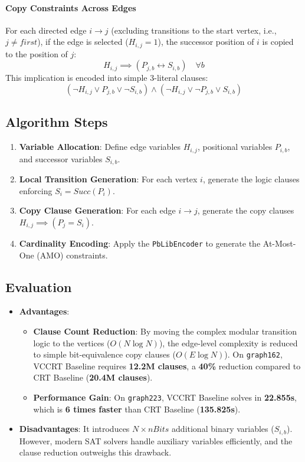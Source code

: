 \paragraph{Copy Constraints Across Edges}
For each directed edge $i \to j$ (excluding transitions to the start vertex, i.e., $j \neq first$), if the edge is selected ($H_{i,j} = 1$), the successor position of $i$ is copied to the position of $j$:
\begin{equation}
    H_{i,j} \implies (P_{j,b} \leftrightarrow S_{i,b}) \quad \forall b
\end{equation}
This implication is encoded into simple 3-literal clauses:
\begin{equation}
    \left( \neg H_{i,j} \lor P_{j,b} \lor \neg S_{i,b} \right) \land \left( \neg H_{i,j} \lor \neg P_{j,b} \lor S_{i,b} \right)
\end{equation}

\subsection{Algorithm Steps}
\begin{enumerate}
    \item \textbf{Variable Allocation}: Define edge variables $H_{i,j}$, positional variables $P_{i,b}$, and successor variables $S_{i,b}$.
    \item \textbf{Local Transition Generation}: For each vertex $i$, generate the logic clauses enforcing $S_i = Succ(P_i)$.
    \item \textbf{Copy Clause Generation}: For each edge $i \to j$, generate the copy clauses $H_{i,j} \implies (P_j = S_i)$.
    \item \textbf{Cardinality Encoding}: Apply the \texttt{PbLibEncoder} to generate the At-Most-One (AMO) constraints.
\end{enumerate}

\subsection{Evaluation}
\begin{itemize}
    \item \textbf{Advantages}:
    \begin{itemize}
        \item \textbf{Clause Count Reduction}: By moving the complex modular transition logic to the vertices ($O(N \log N)$), the edge-level complexity is reduced to simple bit-equivalence copy clauses ($O(E \log N)$). On \texttt{graph162}, VCCRT Baseline requires \textbf{12.2M clauses}, a \textbf{40\%} reduction compared to CRT Baseline (\textbf{20.4M clauses}).
        \item \textbf{Performance Gain}: On \texttt{graph223}, VCCRT Baseline solves in \textbf{22.855s}, which is \textbf{6 times faster} than CRT Baseline (\textbf{135.825s}).
    \end{itemize}
    \item \textbf{Disadvantages}: It introduces $N \times nBits$ additional binary variables ($S_{i,b}$). However, modern SAT solvers handle auxiliary variables efficiently, and the clause reduction outweighs this drawback.
\end{itemize}
